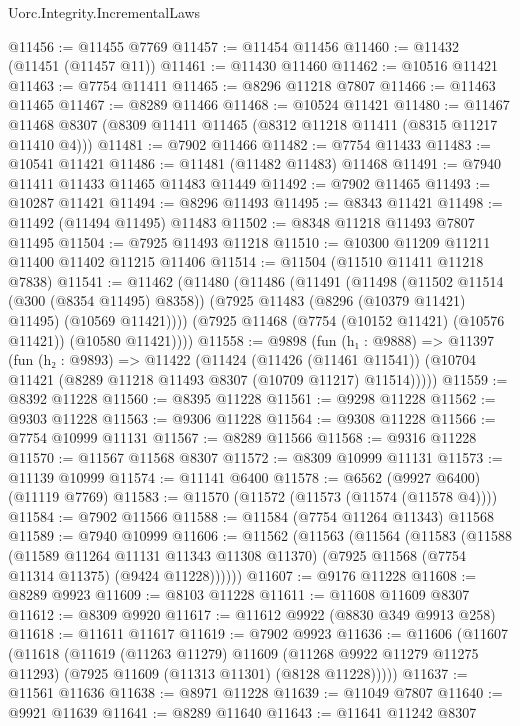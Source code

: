 \begin{lexlean}{Uorc.Integrity.IncrementalLaws}
\begin{coremodule}
@11456 := @11455 @7769
@11457 := @11454 @11456
@11460 := @11432 (@11451 (@11457 @11))
@11461 := @11430 @11460
@11462 := @10516 @11421
@11463 := @7754 @11411
@11465 := @8296 @11218 @7807
@11466 := @11463 @11465
@11467 := @8289 @11466
@11468 := @10524 @11421
@11480 := @11467 @11468 @8307 (@8309 @11411 @11465 (@8312 @11218 @11411 (@8315 @11217 @11410 @4)))
@11481 := @7902 @11466
@11482 := @7754 @11433
@11483 := @10541 @11421
@11486 := @11481 (@11482 @11483) @11468
@11491 := @7940 @11411 @11433 @11465 @11483 @11449
@11492 := @7902 @11465
@11493 := @10287 @11421
@11494 := @8296 @11493
@11495 := @8343 @11421
@11498 := @11492 (@11494 @11495) @11483
@11502 := @8348 @11218 @11493 @7807 @11495
@11504 := @7925 @11493 @11218
@11510 := @10300 @11209 @11211 @11400 @11402 @11215 @11406
@11514 := @11504 (@11510 @11411 @11218 @7838)
@11541 := @11462
    (@11480
      (@11486
        (@11491
          (@11498
            (@11502 @11514 (@300 (@8354 @11495) @8358))
            (@7925 @11483 (@8296 (@10379 @11421) @11495) (@10569 @11421))))
        (@7925 @11468 (@7754 (@10152 @11421) (@10576 @11421)) (@10580 @11421))))
@11558 := @9898
    (fun (h₁ : @9888) =>
    @11397
      (fun (h₂ : @9893) =>
      @11422
        (@11424
          (@11426 (@11461 @11541))
          (@10704 @11421 (@8289 @11218 @11493 @8307 (@10709 @11217) @11514)))))
@11559 := @8392 @11228
@11560 := @8395 @11228
@11561 := @9298 @11228
@11562 := @9303 @11228
@11563 := @9306 @11228
@11564 := @9308 @11228
@11566 := @7754 @10999 @11131
@11567 := @8289 @11566
@11568 := @9316 @11228
@11570 := @11567 @11568 @8307
@11572 := @8309 @10999 @11131
@11573 := @11139 @10999
@11574 := @11141 @6400
@11578 := @6562 (@9927 @6400) (@11119 @7769)
@11583 := @11570 (@11572 (@11573 (@11574 (@11578 @4))))
@11584 := @7902 @11566
@11588 := @11584 (@7754 @11264 @11343) @11568
@11589 := @7940 @10999
@11606 := @11562
    (@11563
      (@11564
        (@11583
          (@11588
            (@11589 @11264 @11131 @11343 @11308 @11370)
            (@7925 @11568 (@7754 @11314 @11375) (@9424 @11228))))))
@11607 := @9176 @11228
@11608 := @8289 @9923
@11609 := @8103 @11228
@11611 := @11608 @11609 @8307
@11612 := @8309 @9920
@11617 := @11612 @9922 (@8830 @349 @9913 @258)
@11618 := @11611 @11617
@11619 := @7902 @9923
@11636 := @11606
    (@11607
      (@11618
        (@11619
          (@11263 @11279)
          @11609
          (@11268 @9922 @11279 @11275 @11293)
          (@7925 @11609 (@11313 @11301) (@8128 @11228)))))
@11637 := @11561 @11636
@11638 := @8971 @11228
@11639 := @11049 @7807
@11640 := @9921 @11639
@11641 := @8289 @11640
@11643 := @11641 @11242 @8307

\end{coremodule}
\end{lexlean}
